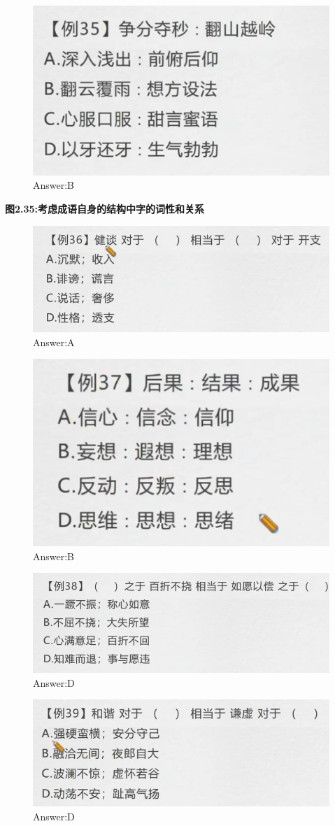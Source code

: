 \documentclass{article}
\numberwithin{equation}{section}						%
\numberwithin{figure}{section}							%
\begin{document}
\begin{sloppypar}
\begin{figure}[H]
     \centering
     \includegraphics[width=0.4\linewidth]{135.png}
		\caption{Answer:B}
\end{figure}

\textbf{图2.35:考虑成语自身的结构中字的词性和关系}

\begin{figure}[H]
     \centering
     \includegraphics[width=0.4\linewidth]{136.png}
		\caption{Answer:A}
\end{figure}


\begin{figure}[H]
     \centering
     \includegraphics[width=0.4\linewidth]{137.png}
		\caption{Answer:B}
\end{figure}


\begin{figure}[H]
     \centering
     \includegraphics[width=0.4\linewidth]{138.png}
		\caption{Answer:D}
\end{figure}

\begin{figure}[H]
     \centering
     \includegraphics[width=0.4\linewidth]{139.png}
		\caption{Answer:D}
\end{figure}



\end{sloppypar}
\end{document}
